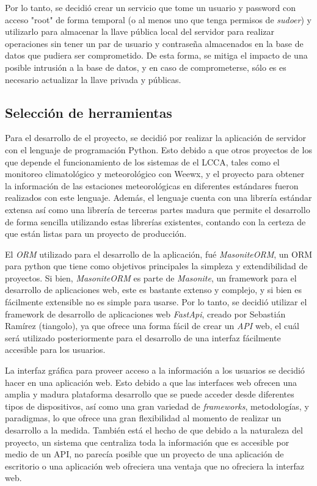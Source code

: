 Por lo tanto, se decidió crear un servicio que tome un usuario y password con acceso "root" de forma temporal (o al menos uno que tenga permisos de \emph{sudoer}) y utilizarlo para almacenar la llave pública local del servidor para realizar operaciones sin tener un par de usuario y contraseña almacenados en la base de datos que pudiera ser comprometido. De esta forma, se mitiga el impacto de una posible intrusión a la base de datos, y en caso de comprometerse, sólo es es necesario actualizar la llave privada y públicas.

\subsection{Selección de herramientas}

Para el desarrollo de el proyecto, se decidió por realizar la aplicación de servidor con el lenguaje de programación Python. Esto debido a que otros proyectos de los que depende el funcionamiento de los sistemas de el LCCA, tales como el monitoreo climatológico y meteorológico con Weewx, y el proyecto para obtener la información de las estaciones meteorológicas en diferentes estándares fueron realizados con este lenguaje. Además, el lenguaje cuenta con una librería estándar extensa así como una librería de terceras partes madura que permite el desarrollo de forma sencilla utilizando estas librerías existentes, contando con la certeza de que están listas para un proyecto de producción.


El \textit{ORM} utilizado para el desarrollo de la aplicación, fué \textit{MasoniteORM}, un ORM para python que tiene como objetivos principales la simpleza y extendibilidad de proyectos. Si bien, \textit{MasoniteORM} es parte de \textit{Masonite}, un framework para el desarrollo de aplicaciones web, este es bastante extenso y complejo, y si bien es fácilmente extensible no es simple para usarse. Por lo tanto, se decidió utilizar el framework de desarrollo de aplicaciones web \textit{FastApi}, creado por Sebastián Ramírez (tiangolo), ya que ofrece una forma fácil de crear un \textit{API} web, el cuál será utilizado posteriormente para el desarrollo de una interfaz fácilmente accesible para los usuarios.

La interfaz gráfica para proveer acceso a la información a los usuarios se decidió hacer en una aplicación web. Esto debido a que las interfaces web ofrecen una amplia y madura plataforma desarrollo que se puede acceder desde diferentes tipos de dispositivos, así como una gran variedad de \textit{frameworks}, metodologías, y paradigmas, lo que ofrece una gran flexibilidad al momento de realizar un desarrollo a la medida. También está el hecho de que debido a la naturaleza del proyecto, un sistema que centraliza toda la información que es accesible por medio de un API, no parecía posible que un proyecto de una aplicación de escritorio o una aplicación web ofreciera una ventaja que no ofreciera la interfaz web.


